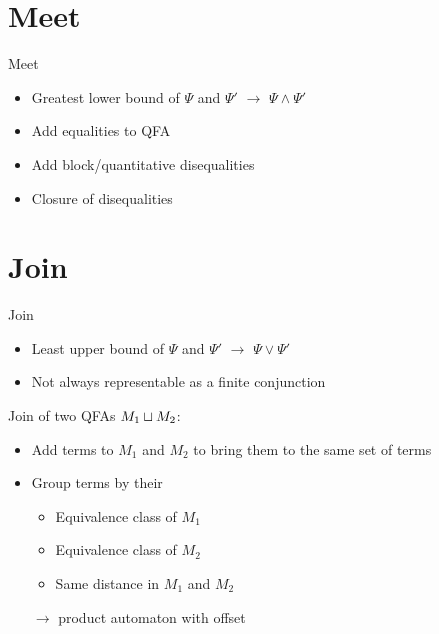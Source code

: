 \documentclass[aspectratio=169]{beamer}
\begin{document}
\section{Meet}
\begin{frame}{Meet}
    \begin{itemize}

        \item Greatest lower bound of $\Psi$ and $\Psi'$ $\rightarrow$ $\Psi \land \Psi'$
              \pause
        \item Add equalities to QFA
              \pause
        \item Add block/quantitative disequalities
              \pause
        \item Closure of disequalities
    \end{itemize}
\end{frame}


\section{Join}
\begin{frame}{Join}
    \begin{itemize}
        \item Least upper bound of $\Psi$ and $\Psi'$ $\rightarrow$ $\Psi \lor \Psi'$
              \pause
        \item Not always representable as a finite conjunction~\cite{join}

    \end{itemize}
\end{frame}

\begin{frame}{Join of two QFAs $M_1 \sqcup M_2$:}
    \begin{itemize}
        \item Add terms to $M_1$ and $M_2$ to bring them to the same set of terms
        \pause
        \item Group terms by their
              \begin{itemize}
                  \item Equivalence class of $M_1$
                  \item Equivalence class of $M_2$
                  \item Same distance in $M_1$ and $M_2$
              \end{itemize}
              \pause
        \item[$\rightarrow$] product automaton with offset
    \end{itemize}
\end{frame}
\end{document}
